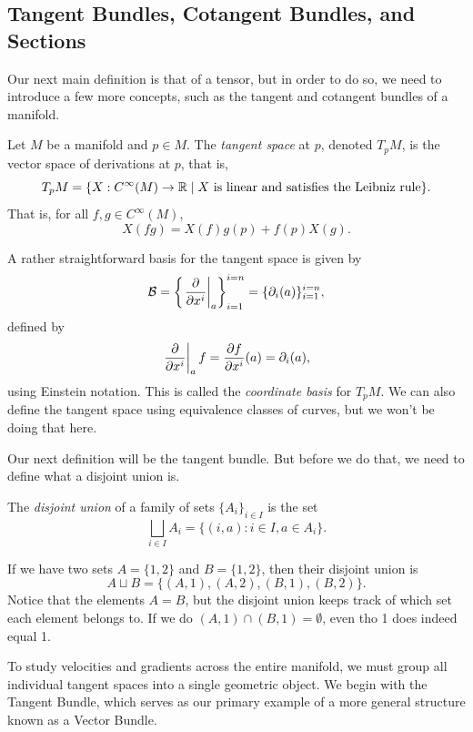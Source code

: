 \subsection{Tangent Bundles, Cotangent Bundles, and Sections} Our next main definition is that of a tensor, but in order to do so, we need to introduce a few more concepts, such as the tangent and cotangent bundles of a manifold.

\begin{definition}
  Let $M$ be a manifold and $p \in M$. The \emph{tangent space} at $p$, denoted $T_pM$, is the vector space of derivations at $p$, that is,
  \[%
    T_pM = \{X : C^\infty(M) \to \R \mid X~\text{is linear and satisfies the Leibniz rule}\}
  .\]%
  That is, for all $f,g \in C^\infty(M)$,
  \[%
    X(fg) = X(f)g(p) + f(p)X(g)
  .\]%
\end{definition}


A rather straightforward basis for the tangent space is given by
\[%
  \B = \left\{\left.\pdv{}{x^i}\right\rvert_a\right\}_{i=1}^{i=n} = \{\pd{i}(a)\}_{i=1}^{i=n}
,\]%
defined by
\[%
  \left.\pdv{}{x^i}\right\rvert_a f = \pdv{f}{x^i}(a) = \pd{i}(a)
,\]%
using Einstein notation. This is called the \emph{coordinate basis} for $T_pM$. We can also define the tangent space using equivalence classes of curves, but we won't be doing that here.

Our next definition will be the tangent bundle. But before we do that, we need to define what a disjoint union is.

\begin{definition}
  The \emph{disjoint union} of a family of sets $\{A_i\}_{i \in I}$ is the set
  \[%
    \bigsqcup_{i \in I} A_i = \{(i, a) : i \in I, a \in A_i\}
  .\]%
\end{definition}

\begin{example}
  If we have two sets $A = \{1, 2\}$ and $B = \{1, 2\}$, then their disjoint union is
  \[%
    A \sqcup B = \{(A, 1), (A, 2), (B, 1), (B, 2)\}
  .\]%
  Notice that the elements $A = B$, but the disjoint union keeps track of which set each element belongs to. If we do $(A, 1) \cap (B, 1) = \emptyset$, even tho 1 does indeed equal 1.
\end{example}

To study velocities and gradients across the entire manifold, we must group all individual tangent spaces into a single geometric object. We begin with the Tangent Bundle, which serves as our primary example of a more general structure known as a Vector Bundle.

